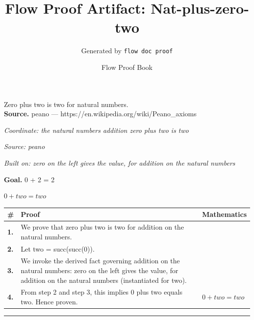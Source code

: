\documentclass[11pt]{article}
\title{Flow Proof Artifact: Nat-plus-zero-two}
\author{Generated by \texttt{flow doc proof}}
\date{Flow Proof Book}
\theoremstyle{definition}
\begin{document}
\maketitle
Zero plus two is two for natural numbers.\\[0.5em]
\textbf{Source.} peano — https://en.wikipedia.org/wiki/Peano\_axioms\\[0.5em]
\bigskip
{}\par
\smallskip\noindent\textit{Coordinate: the natural numbers \cdot addition \cdot zero plus two is two}\par
\smallskip\noindent\textit{Source: peano}\par
\smallskip\noindent\textit{Built on: zero on the left gives the value, for addition on the natural numbers}\par
\medskip
\noindent\textbf{Goal.} 0 + 2 = 2\par
\noindent$\displaystyle 0 + two = two$\par
\medskip
\noindent
\begin{tabular}{@{} >{\raggedright\arraybackslash}p{} >{\raggedright\arraybackslash}p{} >{\raggedleft\arraybackslash}p{} @{}}
\textbf{\#} & \textbf{Proof} & \textbf{Mathematics} \\
\midrule
\textbf{1.} & We prove that zero plus two is two for addition on the natural numbers. & \\[0.45em]
\textbf{2.} & Let two = succ(succ(0)). & \\[0.45em]
\textbf{3.} & We invoke the derived fact governing addition on the natural numbers: zero on the left gives the value, for addition on the natural numbers (instantiated for two). & \\[0.45em]
\textbf{4.} & From step 2 and step 3, this implies 0 plus two equals two. Hence proven. & $\displaystyle 0 + two = two$ \\[0.45em]
\bottomrule
\end{tabular}
\label{thm:Nat-addition-zero_plus_two_is_two}
\par\medskip\hrule
\end{document}
